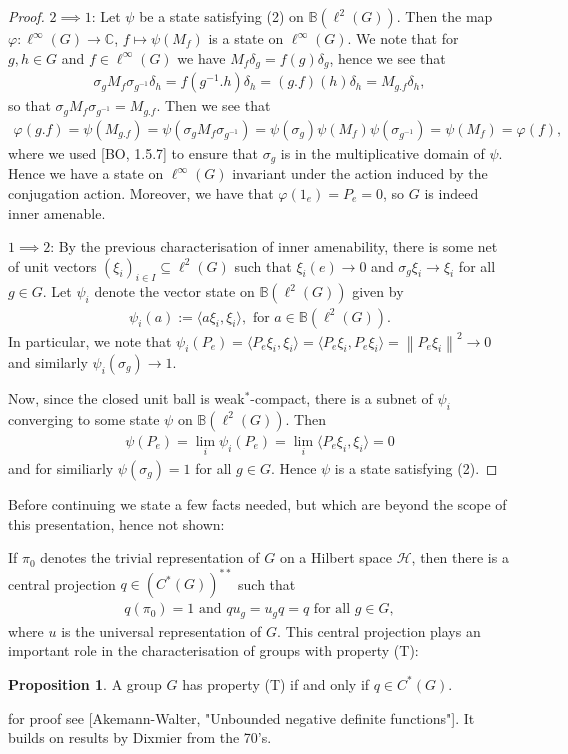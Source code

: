 \documentclass[10pt,oneside,openany,final]{memoir}
\theoremstyle{definition}
\newtheorem{proposition}[theorem]{Proposition}
\theoremstyle{Break}
\newcommand{\lv}{\left\lVert}
\newcommand{\rv}{\right\rVert}
\newcommand{\C}{\mathbb{C}}
\newcommand{\B}{\mathbb{B}}
\renewcommand{\H}{\mathcal{H}}
\begin{document}
\begin{proof}
$2 \implies 1$: Let $\psi$ be a state satisfying (2) on $\B(\ell^2(G))$. Then the map $\varphi \colon \ell^\infty(G) \to \C$, $f \mapsto \psi(M_f)$ is a state on $\ell^\infty(G)$. We note that for $g,h \in G$ and $f \in \ell^\infty(G)$ we have $M_f\delta_g=f(g)\delta_g$, hence we see that
\begin{align*}
	\sigma_g M_f \sigma_{g^{-1}} \delta_h=f(g^{-1}.h)\delta_h=(g.f)(h) \delta_h=M_{g.f}\delta_h,
\end{align*}
so that $\sigma_g M_f \sigma_{g^{-1}}=M_{g.f}$. Then we see that 
\begin{align*}
	\varphi(g.f)=\psi(M_{g.f})=\psi(\sigma_gM_f\sigma_{g^{-1}})=\psi(\sigma_g)\psi(M_f)\psi(\sigma_{g^{-1}})=\psi(M_f)=\varphi(f),
\end{align*}
where we used [BO, 1.5.7] to ensure that $\sigma_g$ is in the multiplicative domain of $\psi$. Hence we have a state on $\ell^\infty(G)$ invariant under the action induced by the conjugation action. Moreover, we have that $\varphi(1_{{e}})=P_e=0$, so $G$ is indeed inner amenable.

$1 \implies 2$: By the previous characterisation of inner amenability, there is some net of unit vectors $(\xi_i)_{i \in I} \subseteq \ell^2(G)$ such that $\xi_i(e) \to 0$ and $\sigma_g \xi_i\to \xi_i$ for all $g \in G$. Let $\psi_i$ denote the vector state on $\B(\ell^2(G))$ given by 
\begin{align*}
	\psi_i(a):=\langle a \xi_i,  \xi_i \rangle, \text{ for } a \in \B(\ell^2(G)).
\end{align*}
In particular, we note that $\psi_i(P_e)=\langle P_e \xi_i,\xi_i\rangle =\langle P_e \xi_i, P_e \xi_i \rangle = \lv P_e \xi_i \rv^2 \to 0$ and similarly $\psi_i(\sigma_g)\to 1$.

Now, since the closed unit ball is weak$^*$-compact, there is a subnet of $\psi_i$ converging to some state $\psi$ on $\B(\ell^2(G))$. Then 
\begin{align*}
	\psi(P_e)=\lim_i \psi_i(P_e)=\lim_i \langle P_e \xi_i, \xi_i\rangle = 0 
\end{align*}
and for similiarly $\psi(\sigma_g)=1$ for all $g \in G$. Hence $\psi$ is a state satisfying (2).
\end{proof}

Before continuing we state a few facts needed, but which are beyond the scope of this presentation, hence not shown:


If $\pi_0$ denotes the trivial representation of $G$ on a Hilbert space $\H$, then there is a central projection $q \in (C^*(G))^{**}$ such that
\begin{align*}
	q(\pi_0)=1 \text{ and }q u_g=u_gq=q \text{ for all } g \in G,
\end{align*}
where $u$ is the universal representation of $G$. This central projection plays an important role in the characterisation of groups with property (T):
\begin{proposition}
A group $G$ has property (T) if and only if $q \in C^*(G)$.	
\end{proposition}
for proof see [Akemann-Walter, "Unbounded negative definite functions"]. It builds on results by Dixmier from the 70's.
\end{document}
